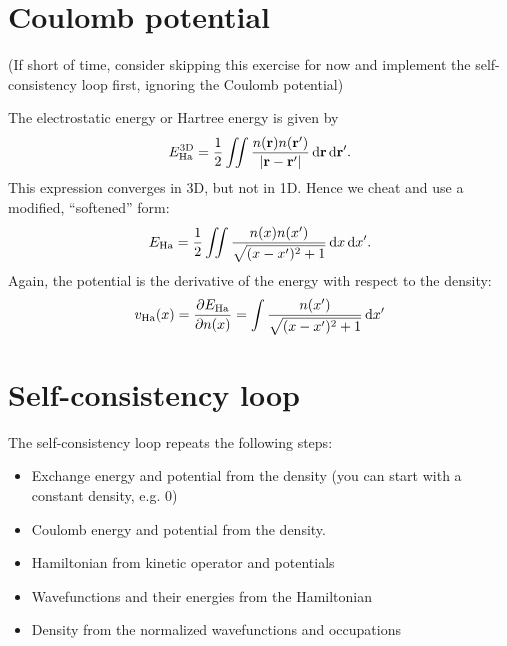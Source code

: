 \documentclass{article}
\begin{document}

\section*{Coulomb potential}
(If short of time, consider skipping this exercise for now and implement the
self-consistency loop first, ignoring the Coulomb potential)

The electrostatic energy or Hartree energy is given by
\begin{align}
  E_{\mathrm{Ha}}^{\mathrm{3D}} = \frac12 \iint \frac{n(\mathbf r)n(\mathbf r')}{|\mathbf r - \mathbf r'|}\,\mathrm d \mathbf r \,\mathrm d \mathbf r'.
\end{align}
This expression converges in 3D, but not in 1D.  Hence we cheat and use
a modified, ``softened'' form:
\begin{align}
E_{\mathrm{Ha}} = \frac12 \iint \frac{n(x) n(x')}{\sqrt{(x - x')^2 + 1}}
\,\mathrm d x \,\mathrm d x'.
\end{align}
Again, the potential is the derivative of the energy with respect to the
density:
\begin{align}
  v_{\mathrm{Ha}}(x) = \frac{\partial E_{\mathrm{Ha}}}{\partial n(x)} =
  \int \frac{n(x')}{\sqrt{(x - x')^2 + 1}} \,\mathrm d x'
\end{align}


\section*{Self-consistency loop}
The self-consistency loop repeats the following steps:
\begin{itemize}
\item Exchange energy and potential from the density (you can start with a
  constant density, e.g. 0)
\item Coulomb energy and potential from the density.
\item Hamiltonian from kinetic operator and potentials
\item Wavefunctions and their energies from the Hamiltonian
\item Density from the normalized wavefunctions and occupations
\end{itemize}


\end{document}
